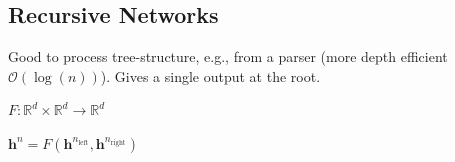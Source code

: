 \documentclass[a2paper,8pt]{extarticle}
\newcommand{\BigO}{\mathcal{O}}
\newcommand{\R}{\mathbb{R}}
\renewcommand{\vec}[1]{\mathbf{#1}}
\newcommand{\vh}{\vec{h}}
\newcommand{\todo}[1]{\textbf{TODO:} #1}
\newcommand{\todo}[1]{%
}
\newcommand{\sep}{\vspace{0pt}\noindent\hrule\vspace{0pt}}
\newcommand{\sep}{\vspace{5pt}\noindent\hrule\vspace{5pt}}
\begin{document}
\begin{landscape}
\begin{multicols*}{7}

\subsection{Recursive Networks}

Good to process tree-structure, e.g., from a parser (more depth efficient
$\BigO(\log(n))$). Gives a single output at the root.

$F\colon\R^d\times\R^d\to\R^d$

$\vh^n=F(\vh^{n_{\text{left}}},\vh^{n_{\text{right}}})$


\end{multicols*}
\end{landscape}
\end{document}
